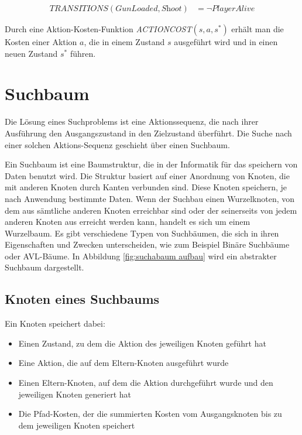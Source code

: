 \begin{align}
	\textit{TRANSITIONS}(\textit{GunLoaded}, \textit{Shoot}) &= \lnot \textit{PlayerAlive}
\end{align}

Durch eine Aktion-Kosten-Funktion \textit{ACTIONCOST}$(s,a,s^*)$ erh\"{a}lt man die Kosten einer Aktion $a$, die in einem Zustand $s$ ausgef\"{u}hrt wird und in einen neuen Zustand $s^*$ f\"{u}hren.

\section{Suchbaum}
\label{chap:suchbaum}

Die L\"{o}sung eines Suchproblems ist eine Aktionssequenz, die nach ihrer Ausf\"{u}hrung den Ausgangszustand in den Zielzustand \"{u}berf\"{u}hrt. Die Suche nach einer solchen Aktions-Sequenz geschieht \"{u}ber einen Suchbaum.

Ein Suchbaum ist eine Baumstruktur, die in der Informatik f\"{u}r das speichern von Daten benutzt wird. Die Struktur basiert auf einer Anordnung von Knoten, die mit anderen Knoten durch Kanten verbunden sind. Diese Knoten speichern, je nach Anwendung bestimmte Daten. Wenn der Suchbau einen Wurzelknoten, von dem aus s\"{a}mtliche anderen Knoten erreichbar sind oder der seinerseits von jedem anderen Knoten aus erreicht werden kann, handelt es sich um einem Wurzelbaum. Es gibt verschiedene Typen von Suchb\"{a}umen, die sich in ihren Eigenschaften und Zwecken unterscheiden, wie zum Beispiel Bin\"{a}re Suchb\"{a}ume oder AVL-B\"{a}ume. In Abbildung \ref{fig:suchabaum aufbau} wird ein abstrakter Suchbaum dargestellt.

\subsection{Knoten eines Suchbaums}
\label{chap:knoten eines suchbaums}

Ein Knoten speichert dabei:
\begin{itemize}
	\item Einen Zustand, zu dem die Aktion des jeweiligen Knoten gef\"{u}hrt hat
	\item Eine Aktion, die auf dem Eltern-Knoten ausgef\"{u}hrt wurde
	\item Einen Eltern-Knoten, auf dem die Aktion durchgef\"{u}hrt wurde und den jeweiligen Knoten generiert hat
	\item Die Pfad-Kosten, der die summierten Kosten vom Ausgangsknoten bis zu dem jeweiligen Knoten speichert
\end{itemize}

